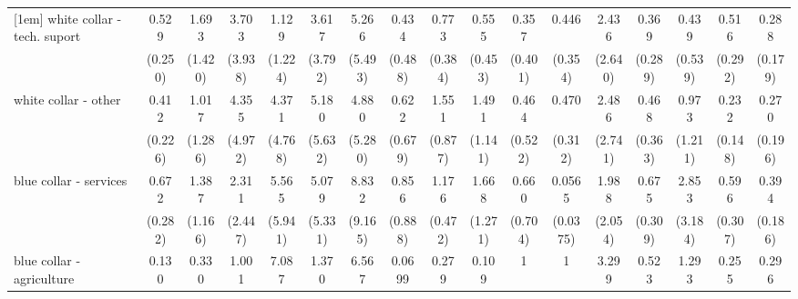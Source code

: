 {\begin{tabular}{l*{16}{c}}
[1em]
white collar - tech. suport&       0.529         &       1.693         &       3.703         &       1.129         &       3.617         &       5.266         &       0.434         &       0.773         &       0.555         &       0.357         &       0.446         &       2.436         &       0.369         &       0.439         &       0.516         &       0.288\sym{*}  \\
                    &     (0.250)         &     (1.420)         &     (3.938)         &     (1.224)         &     (3.792)         &     (5.493)         &     (0.488)         &     (0.384)         &     (0.453)         &     (0.401)         &     (0.354)         &     (2.640)         &     (0.289)         &     (0.539)         &     (0.292)         &     (0.179)         \\
[1em]
white collar - other&       0.412         &       1.017         &       4.355         &       4.371         &       5.180         &       4.880         &       0.622         &       1.551         &       1.491         &       0.464         &       0.470         &       2.486         &       0.468         &       0.973         &       0.232\sym{*}  &       0.270         \\
                    &     (0.226)         &     (1.286)         &     (4.972)         &     (4.768)         &     (5.632)         &     (5.280)         &     (0.679)         &     (0.877)         &     (1.141)         &     (0.522)         &     (0.312)         &     (2.741)         &     (0.363)         &     (1.211)         &     (0.148)         &     (0.196)         \\
[1em]
blue collar - services&       0.672         &       1.387         &       2.311         &       5.565         &       5.079         &       8.832\sym{*}  &       0.856         &       1.176         &       1.668         &       0.660         &      0.0565\sym{***}&       1.988         &       0.675         &       2.853         &       0.596         &       0.394\sym{*}  \\
                    &     (0.282)         &     (1.166)         &     (2.447)         &     (5.941)         &     (5.331)         &     (9.165)         &     (0.888)         &     (0.472)         &     (1.271)         &     (0.704)         &    (0.0375)         &     (2.054)         &     (0.309)         &     (3.184)         &     (0.307)         &     (0.186)         \\
[1em]
blue collar - agriculture&       0.130         &       0.330         &       1.001         &       7.087         &       1.370         &       6.567         &      0.0699         &       0.279         &       0.109         &           1         &           1         &       3.299         &       0.523         &       1.293         &       0.255         &       0.296         \\

\end{tabular}}
